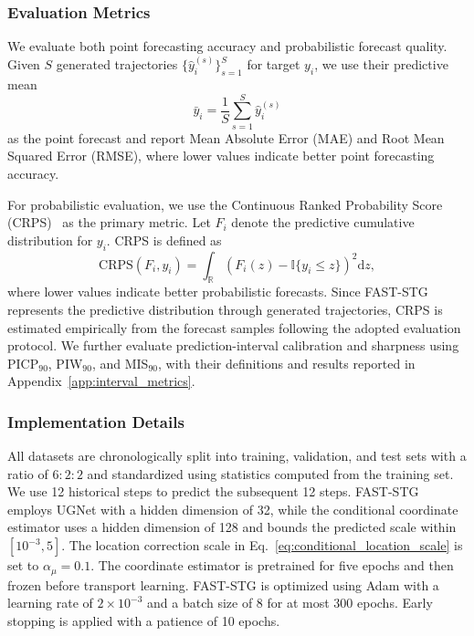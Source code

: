 \documentclass[sigconf, anonymous, review]{acmart}
\begin{document}
\subsubsection{Evaluation Metrics}
\label{sec:metrics}

We evaluate both point forecasting accuracy and probabilistic forecast
quality. Given $S$ generated trajectories
$\{\hat{y}_{i}^{(s)}\}_{s=1}^{S}$ for target $y_i$, we use their
predictive mean
%
\begin{equation}
\bar{y}_{i}
=
\frac{1}{S}
\sum_{s=1}^{S}
\hat{y}_{i}^{(s)}
\end{equation}
%
as the point forecast and report Mean Absolute Error (MAE) and Root
Mean Squared Error (RMSE), where lower values indicate better point
forecasting accuracy.

For probabilistic evaluation, we use the Continuous Ranked Probability
Score (CRPS)~\cite{gneiting2007scoring} as the primary metric. Let
$F_i$ denote the predictive cumulative distribution for $y_i$. CRPS is
defined as
%
\begin{equation}
\mathrm{CRPS}(F_i,y_i)
=
\int_{\mathbb{R}}
\left(
F_i(z)-\mathbb{I}\{y_i\leq z\}
\right)^{2}
\mathrm{d}z,
\label{eq:crps}
\end{equation}
%
where lower values indicate better probabilistic forecasts. Since
FAST-STG represents the predictive distribution through generated
trajectories, CRPS is estimated empirically from the forecast samples
following the adopted evaluation protocol. We further evaluate
prediction-interval calibration and sharpness using
PICP$_{90}$, PIW$_{90}$, and MIS$_{90}$, with their definitions and
results reported in Appendix~\ref{app:interval_metrics}.

\subsubsection{Implementation Details}
\label{sec:implementation}

All datasets are chronologically split into training, validation, and
test sets with a ratio of $6:2:2$ and standardized using statistics
computed from the training set. We use 12 historical steps to predict
the subsequent 12 steps. FAST-STG employs UGNet with a hidden dimension of 32, while the
conditional coordinate estimator uses a hidden dimension of 128 and
bounds the predicted scale within $[10^{-3},5]$. The location
correction scale in Eq.~\eqref{eq:conditional_location_scale} is set to
$\alpha_{\mu}=0.1$. The coordinate estimator is pretrained for five
epochs and then frozen before transport learning. FAST-STG is
optimized using Adam with a learning rate of $2\times10^{-3}$ and a
batch size of 8 for at most 300 epochs. Early stopping is applied with
a patience of 10 epochs.
\end{document}
